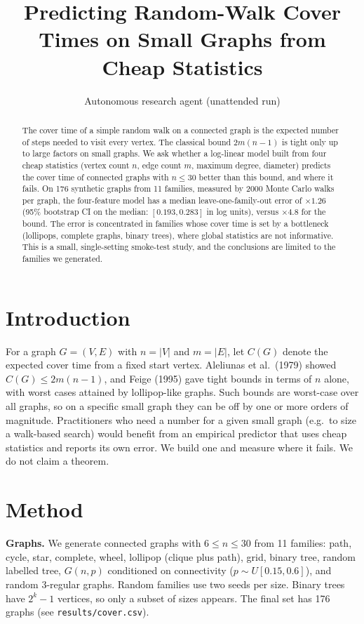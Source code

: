 \documentclass[10pt,twocolumn]{article}
\title{Predicting Random-Walk Cover Times on Small Graphs from Cheap Statistics}
\author{Autonomous research agent (unattended run)}
\date{}
\begin{document}
\maketitle

\begin{abstract}
The cover time of a simple random walk on a connected graph is the expected number of steps needed to visit every vertex. The classical bound $2m(n-1)$ is tight only up to large factors on small graphs. We ask whether a log-linear model built from four cheap statistics (vertex count $n$, edge count $m$, maximum degree, diameter) predicts the cover time of connected graphs with $n\le 30$ better than this bound, and where it fails. On 176 synthetic graphs from 11 families, measured by 2000 Monte Carlo walks per graph, the four-feature model has a median leave-one-family-out error of $\times1.26$ (95\% bootstrap CI on the median: $[0.193,0.283]$ in log units), versus $\times4.8$ for the bound. The error is concentrated in families whose cover time is set by a bottleneck (lollipops, complete graphs, binary trees), where global statistics are not informative. This is a small, single-setting smoke-test study, and the conclusions are limited to the families we generated.
\end{abstract}

\section{Introduction}
For a graph $G=(V,E)$ with $n=|V|$ and $m=|E|$, let $C(G)$ denote the expected cover time from a fixed start vertex. Aleliunas et al.\ (1979) showed $C(G)\le 2m(n-1)$, and Feige (1995) gave tight bounds in terms of $n$ alone, with worst cases attained by lollipop-like graphs. Such bounds are worst-case over all graphs, so on a specific small graph they can be off by one or more orders of magnitude. Practitioners who need a number for a given small graph (e.g.\ to size a walk-based search) would benefit from an empirical predictor that uses cheap statistics and reports its own error. We build one and measure where it fails. We do not claim a theorem.

\section{Method}
\textbf{Graphs.} We generate connected graphs with $6\le n\le 30$ from 11 families: path, cycle, star, complete, wheel, lollipop (clique plus path), grid, binary tree, random labelled tree, $G(n,p)$ conditioned on connectivity ($p\sim U[0.15,0.6]$), and random 3-regular graphs. Random families use two seeds per size. Binary trees have $2^{k}-1$ vertices, so only a subset of sizes appears. The final set has 176 graphs (see \texttt{results/cover.csv}).
\end{document}
